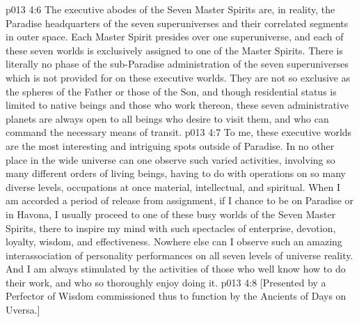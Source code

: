 \vs p013 4:6 \pc The executive abodes of the Seven Master Spirits are, in reality, the Paradise headquarters of the seven superuniverses and their correlated segments in outer space. Each Master Spirit presides over one superuniverse, and each of these seven worlds is exclusively assigned to one of the Master Spirits. There is literally no phase of the sub\hyp{}Paradise administration of the seven superuniverses which is not provided for on these executive worlds. They are not so exclusive as the spheres of the Father or those of the Son, and though residential status is limited to native beings and those who work thereon, these seven administrative planets are always open to all beings who desire to visit them, and who can command the necessary means of transit.
\vs p013 4:7 To me, these executive worlds are the most interesting and intriguing spots outside of Paradise. In no other place in the wide universe can one observe such varied activities, involving so many different orders of living beings, having to do with operations on so many diverse levels, occupations at once material, intellectual, and spiritual. When I am accorded a period of release from assignment, if I chance to be on Paradise or in Havona, I usually proceed to one of these busy worlds of the Seven Master Spirits, there to inspire my mind with such spectacles of enterprise, devotion, loyalty, wisdom, and effectiveness. Nowhere else can I observe such an amazing interassociation of personality performances on all seven levels of universe reality. And I am always stimulated by the activities of those who well know how to do their work, and who so thoroughly enjoy doing it.
\vsetoff
\vs p013 4:8 [Presented by a Perfector of Wisdom commissioned thus to function by the Ancients of Days on Uversa.]
\quizlink
